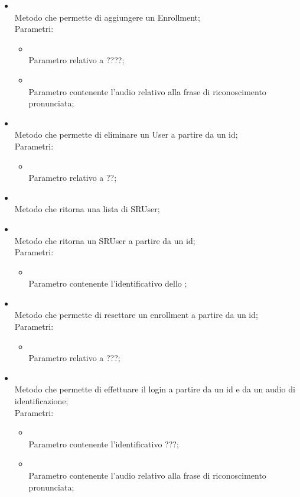 \begin{itemize}
\begin{itemize}
		\item[]  \\
		Metodo che permette di aggiungere un Enrollment;\\
		Parametri:
		\begin{itemize}
			\item {} \\
			Parametro relativo a ????;
			\item {} \\
			Parametro contenente l'audio relativo alla frase di riconoscimento pronunciata;
		\end{itemize}
		\item[]  \\
		Metodo che permette di eliminare un User a partire da un id;\\
		Parametri:
		\begin{itemize}
			\item {} \\
			Parametro relativo a ??;
		\end{itemize}
		\item[]  \\
		Metodo che ritorna una lista di SRUser;\\
		\item[]  \\
		Metodo che ritorna un SRUser a partire da un id;\\
		Parametri:
		\begin{itemize}
			\item {} \\
			Parametro contenente l'identificativo dello ;
		\end{itemize}
		\item[]  \\
		Metodo che permette di resettare un enrollment a partire da un id;\\
		Parametri:
		\begin{itemize}
			\item {} \\
			Parametro relativo a ???;
		\end{itemize}
		\item[]  \\
		Metodo che permette di effettuare il login a partire da un id e da un audio di identificazione;\\
		Parametri:
		\begin{itemize}
			\item {} \\
			Parametro contenente l'identificativo ???;
			\item {} \\
			Parametro contenente l'audio relativo alla frase di riconoscimento pronunciata;
		\end{itemize}
	\end{itemize}
\end{itemize}

